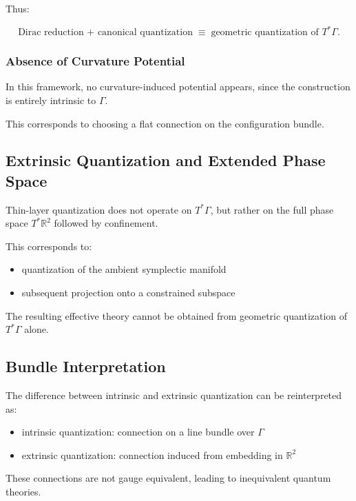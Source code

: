 \documentclass[11pt]{article}
\begin{document}
Thus:

\begin{equation}
\text{Dirac reduction + canonical quantization}
\;\equiv\;
\text{geometric quantization of } T^*\Gamma.
\end{equation}

\subsubsection{Absence of Curvature Potential}

In this framework, no curvature-induced potential appears, since the construction is entirely intrinsic to $\Gamma$.

This corresponds to choosing a flat connection on the configuration bundle.

\subsection{Extrinsic Quantization and Extended Phase Space}

Thin-layer quantization does not operate on $T^*\Gamma$, but rather on the full phase space $T^*\mathbb{R}^2$ followed by confinement.

This corresponds to:

\begin{itemize}
\item quantization of the ambient symplectic manifold
\item subsequent projection onto a constrained subspace
\end{itemize}

The resulting effective theory cannot be obtained from geometric quantization of $T^*\Gamma$ alone.

\subsection{Bundle Interpretation}

The difference between intrinsic and extrinsic quantization can be reinterpreted as:

\begin{itemize}
\item intrinsic quantization: connection on a line bundle over $\Gamma$
\item extrinsic quantization: connection induced from embedding in $\mathbb{R}^2$
\end{itemize}

These connections are not gauge equivalent, leading to inequivalent quantum theories.
\end{document}
